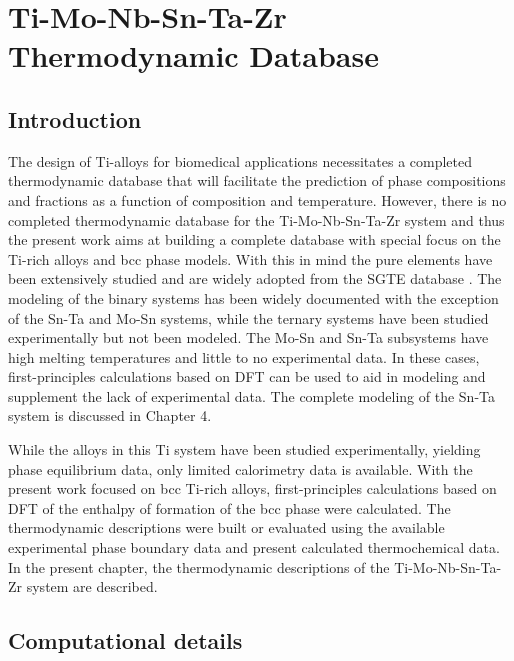\chapter{Ti-Mo-Nb-Sn-Ta-Zr Thermodynamic Database}

\section{Introduction}

The design of Ti-alloys for biomedical applications necessitates a completed thermodynamic database that will facilitate the prediction of phase compositions and fractions as a function of composition and temperature. However, there is no completed thermodynamic database for the Ti-Mo-Nb-Sn-Ta-Zr system and thus the present work aims at building a complete database with special focus on the Ti-rich alloys and bcc phase models. With this in mind the pure elements have been extensively studied and are widely adopted from the SGTE database \cite{Dinsdale1991}. The modeling of the binary systems has been widely documented with the exception of the Sn-Ta and Mo-Sn systems, while the ternary systems have been studied experimentally but not been modeled. The Mo-Sn and Sn-Ta subsystems have high melting temperatures and little to no experimental data. In these cases, first-principles calculations based on DFT can be used to aid in modeling and supplement the lack of experimental data. The complete modeling of the Sn-Ta system is discussed in Chapter 4.  

While the alloys in this Ti system have been studied experimentally, yielding phase equilibrium data, only limited calorimetry data is available. With the present work focused on bcc Ti-rich alloys, first-principles calculations based on DFT of the enthalpy of formation of the bcc phase were calculated. The thermodynamic descriptions were built or evaluated using the available experimental phase boundary data and present calculated thermochemical data. In the present chapter, the thermodynamic descriptions of the Ti-Mo-Nb-Sn-Ta-Zr system are described.

\section{Computational details}

